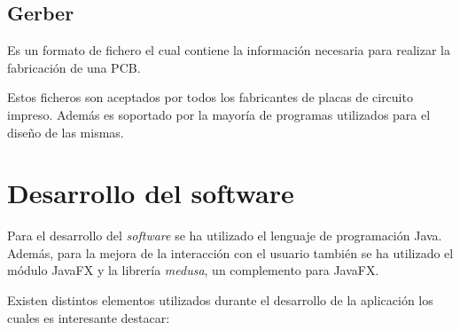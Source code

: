 \subsection{Gerber}\label{gerber}
Es un formato de fichero el cual contiene la información necesaria para realizar la fabricación de una PCB.

Estos ficheros son aceptados por todos los fabricantes de placas de circuito impreso. Además es soportado por la mayoría de programas utilizados para el diseño de las mismas.

\section{Desarrollo del software}\label{desarrollo_del_software}


Para el desarrollo del \emph{software} se ha utilizado el lenguaje de programación Java. Además, para la mejora de la interacción con el usuario también se ha utilizado el módulo JavaFX y la librería \emph{medusa}, un complemento para JavaFX.

Existen distintos elementos utilizados durante el desarrollo de la aplicación los cuales es interesante destacar:

